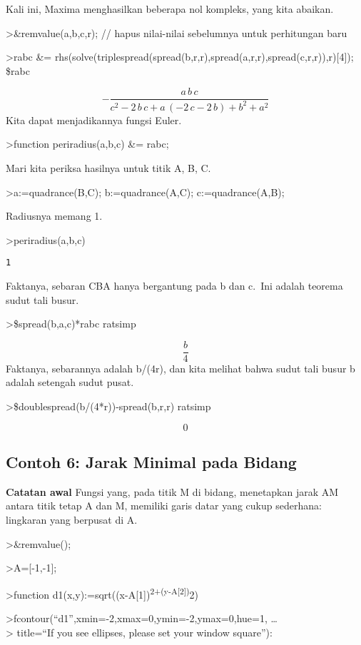 \documentclass[
]{book}
\begin{document}
Kali ini, Maxima menghasilkan beberapa nol kompleks, yang kita abaikan.

\textgreater\&remvalue(a,b,c,r); // hapus nilai-nilai sebelumnya untuk perhitungan baru

\textgreater rabc \&= rhs(solve(triplespread(spread(b,r,r),spread(a,r,r),spread(c,r,r)),r){[}4{]}); \$rabc

\[-\frac{a\,b\,c}{c^2-2\,b\,c+a\,\left(-2\,c-2\,b\right)+b^2+a^2}\]Kita dapat menjadikannya fungsi Euler.

\textgreater function periradius(a,b,c) \&= rabc;

Mari kita periksa hasilnya untuk titik A, B, C.

\textgreater a:=quadrance(B,C); b:=quadrance(A,C); c:=quadrance(A,B);

Radiusnya memang 1.

\textgreater periradius(a,b,c)

\begin{verbatim}
1
\end{verbatim}

Faktanya, sebaran CBA hanya bergantung pada b dan c.~Ini adalah teorema sudut tali busur.

\textgreater\$spread(b,a,c)*rabc \textbar{} ratsimp

\[\frac{b}{4}\]Faktanya, sebarannya adalah b/(4r), dan kita melihat bahwa sudut tali busur b adalah setengah sudut pusat.

\textgreater\$doublespread(b/(4*r))-spread(b,r,r) \textbar{} ratsimp

\[0\] 

\subsection{Contoh 6: Jarak Minimal pada Bidang}

\textbf{Catatan awal } Fungsi yang, pada titik M di bidang, menetapkan jarak AM antara titik tetap A dan M, memiliki garis datar yang cukup sederhana: lingkaran yang berpusat di A.

\textgreater\&remvalue();

\textgreater A={[}-1,-1{]};

\textgreater function d1(x,y):=sqrt((x-A{[}1{]})\textsuperscript{2+(y-A{[}2{]})}2)

\textgreater fcontour(``d1'',xmin=-2,xmax=0,ymin=-2,ymax=0,hue=1, \ldots{}\\
\textgreater{} title=``If you see ellipses, please set your window square''):
\end{document}
